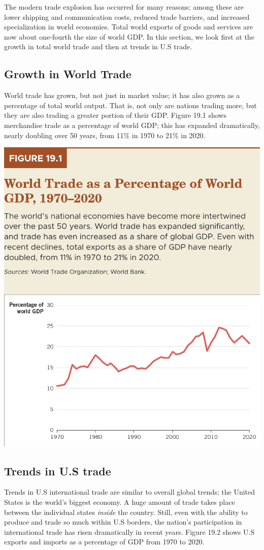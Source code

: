 \documentclass[11pt]{article} %
\begin{document}
The modern trade explosion has occurred for many reasons; among these are lower shipping and communication costs, reduced trade barriers, and increased specialization in world economies. Total world exports of goods and services are now about one-fourth the size of world GDP. In this section, we look first at the growth in total world trade and then at trends in U.S trade.

\subsection*{Growth in World Trade}
World trade has grown, but not just in market value; it has also grown as a percentage of total world output. That is, not only are nations trading more, but they are also trading a greater portion of their GDP. Figure 19.1 shows merchandise trade as a percentage of world GDP; this has expanded dramatically, nearly doubling over 50 years, from 11\% in 1970 to 21\% in 2020.

\begin{center}
\includegraphics[scale=0.5]{images/Figure 19.1.png} 
\end{center}
\subsection*{Trends in U.S trade}
Trends in U.S international trade are similar to overall global trends; the United States is the world's biggest economy. A huge amount of trade takes place between the individual states \textit{inside} the country. Still, even with the ability to produce and trade so much within U.S borders, the nation's participation in international trade has risen dramatically in recent years. Figure 19.2 shows U.S exports and imports as a percentage of GDP from 1970 to 2020.
\end{document}
